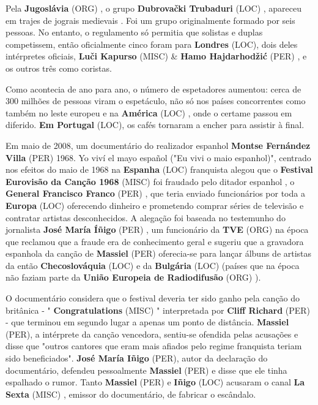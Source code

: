 \documentclass[12pt,a4paper]{article}
\begin{document}
Pela \textbf{Jugoslávia} (ORG) , o grupo \textbf{Dubrovački Trubaduri} (LOC) , apareceu em trajes de jograis medievais . Foi um grupo originalmente formado por seis pessoas. No entanto, o regulamento só permitia que solistas e duplas competissem, então oficialmente cinco foram para \textbf{Londres} (LOC), dois deles intérpretes oficiais, \textbf{Luči Kapurso} (MISC) \& \textbf{Hamo Hajdarhodžić} (PER) , e os outros três como coristas.

Como acontecia de ano para ano, o número de espetadores aumentou: cerca de 300 milhões de pessoas viram o espetáculo, não só nos países concorrentes como também no leste europeu e na \textbf{América} (LOC) , onde o certame passou em diferido. \textbf{Em Portugal} (LOC), os cafés tornaram a encher para assistir à final.

Em maio de 2008, um documentário do realizador espanhol \textbf{Montse Fernández Villa} (PER) 1968. Yo viví el mayo español ("Eu vivi o maio espanhol)", centrado nos efeitos do maio de 1968 na \textbf{Espanha} (LOC) franquista alegou que o \textbf{Festival Eurovisão da Canção 1968} (MISC) foi fraudado pelo ditador espanhol , o \textbf{General Francisco Franco} (PER) , que teria enviado funcionários por toda a \textbf{Europa} (LOC) oferecendo dinheiro e prometendo comprar séries de televisão e contratar artistas desconhecidos. A alegação foi baseada no testemunho do jornalista \textbf{José María Íñigo} (PER) , um funcionário da \textbf{TVE} (ORG) na época que reclamou que a fraude era de conhecimento geral e sugeriu que a gravadora espanhola da canção de \textbf{Massiel} (PER) oferecia-se para lançar álbuns de artistas da então \textbf{Checoslováquia} (LOC) e da \textbf{Bulgária} (LOC) (países que na época não faziam parte da \textbf{União Europeia de Radiodifusão} (ORG) ).

O documentário considera que o festival deveria ter sido ganho pela canção do britânica - " \textbf{Congratulations} (MISC) " interpretada por \textbf{Cliff Richard} (PER) - que terminou em segundo lugar a apenas um ponto de distância. \textbf{Massiel} (PER), a intérprete da canção vencedora, sentiu-se ofendida pelas acusações e disse que "outros cantores que eram mais afiados pelo regime franquista teriam sido beneficiados". \textbf{José María Iñigo} (PER), autor da declaração do documentário, defendeu pessoalmente \textbf{Massiel} (PER) e disse que ele tinha espalhado o rumor. Tanto \textbf{Massiel} (PER) e \textbf{Iñigo} (LOC) acusaram o canal \textbf{La Sexta} (MISC) , emissor do documentário, de fabricar o escândalo.
\end{document}
